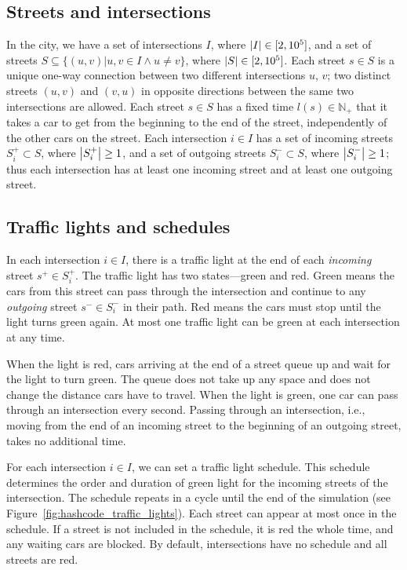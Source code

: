 \subsection{Streets and intersections}

In the city, we have a set of intersections
$I$, where $\left|{I}\right| \in [2, 10^5]$,
and a set of streets
$S \subseteq \{(u, v) | u,v \in I \land u \neq v\}$, where $\left|{S}\right| \in [2, 10^5]$.
Each street $s \in S$ is a unique one-way connection between two different intersections $u$, $v$; two distinct streets $(u, v)$ and $(v, u)$ in opposite directions between the same two intersections are allowed. Each street $s \in S$ has a fixed time $l(s) \in \mathbb{N}_+$ that it takes a car to get from the beginning to the end of the street, independently of the other cars on the street.
Each intersection $i \in I$ has a set of incoming streets $S_i^+ \subset S$, where $\left|{S_i^+}\right| \geq 1$, and a set of outgoing streets $S_i^- \subset S$, where $\left|{S_i^-}\right| \geq 1$; thus each intersection has at least one incoming street and at least one outgoing street.

\subsection{Traffic lights and schedules}

In each intersection $i \in I$, there is a traffic light at the end of each \textit{incoming} street $s^+ \in S_i^+$. The traffic light has two states---green and red. Green means the cars from this street can pass through the intersection and continue to any \textit{outgoing} street $s^- \in S_i^-$ in their path. Red means the cars must stop until the light turns green again. At most one traffic light can be green at each intersection at any time.

When the light is red, cars arriving at the end of a street queue up and wait for the light to turn green. The queue does not take up any space and does not change the distance cars have to travel. When the light is green, one car can pass through an intersection every second. Passing through an intersection, i.e., moving from the end of an incoming street to the beginning of an outgoing street, takes no additional time.

For each intersection $i \in I$, we can set a traffic light schedule. This schedule determines the order and duration of green light for the incoming streets of the intersection. The schedule repeats in a cycle until the end of the simulation (see Figure~\ref{fig:hashcode_traffic_lights}). Each street can appear at most once in the schedule. If a street is not included in the schedule, it is red the whole time, and any waiting cars are blocked. By default, intersections have no schedule and all streets are red.

